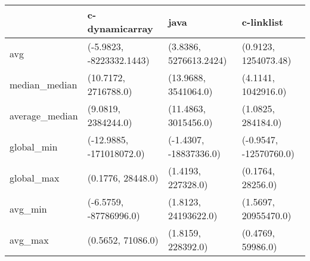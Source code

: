 \begin{tabular}{llll}
\toprule
{} &            c-dynamicarray &                    java &              c-linklist \\
\midrule
avg            &  (-5.9823, -8223332.1443) &  (3.8386, 5276613.2424) &    (0.9123, 1254073.48) \\
median\_median  &      (10.7172, 2716788.0) &    (13.9688, 3541064.0) &     (4.1141, 1042916.0) \\
average\_median &       (9.0819, 2384244.0) &    (11.4863, 3015456.0) &      (1.0825, 284184.0) \\
global\_min     &  (-12.9885, -171018072.0) &  (-1.4307, -18837336.0) &  (-0.9547, -12570760.0) \\
global\_max     &         (0.1776, 28448.0) &      (1.4193, 227328.0) &       (0.1764, 28256.0) \\
avg\_min        &    (-6.5759, -87786996.0) &    (1.8123, 24193622.0) &    (1.5697, 20955470.0) \\
avg\_max        &         (0.5652, 71086.0) &      (1.8159, 228392.0) &       (0.4769, 59986.0) \\
\bottomrule
\end{tabular}
